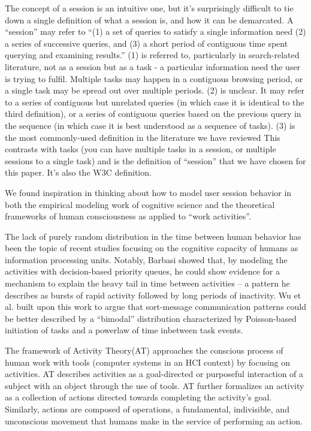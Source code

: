The concept of a session is an intuitive one, but it's surprisingly difficult to tie down a single definition of what a session is, and how it can be demarcated.
A ``session'' may refer to ``(1) a set of queries to satisfy a single information need (2) a series of successive queries, and (3) a short period of contiguous time spent querying and examining results.''\cite{jones2008beyond}
(1) is referred to, particularly in search-related literature,\cite{jones2008beyond, eickhoff2014lessons} not as a session but as a task - a particular information need the user is trying to fulfil.
Multiple tasks may happen in a contiguous browsing period, or a single task may be spread out over multiple periods.
(2) is unclear. It may refer to a series of contiguous but unrelated queries (in which case it is identical to the third definition), or a series of contiguous queries based on the previous query in the sequence (in which case it is best understood as a sequence of tasks).
(3) is the most commonly-used definition in the literature we have reviewed\cite{spiliopoulou2003framework,white2010assessing,govseva2006empirical,nadjarbashi2004improving} This contrasts with tasks (you can have multiple tasks in a session, or multiple sessions to a single task) and is the definition of ``session'' that we have chosen for this paper. It's also the W3C definition.\cite{W3C1999}

We found inspiration in thinking about how to model user session behavior in both the empirical modeling work of cognitive science and the theoretical frameworks of human consciousness as applied to ``work activities''.
 
The lack of purely random distribution in the time between human behavior has been the topic of recent studies focusing on the cognitive capacity of humans as information processing units.  Notably, Barbasi showed that, by modeling the activities with decision-based priority queues, he could show evidence for a mechanism to explain the heavy tail in time between activities\cite{barabasi2005origin} -- a pattern he describes as bursts of rapid activity followed by long periods of inactivity.  Wu et al. built upon this work to argue that sort-message communication patterns could be better described by a ``bimodal'' distribution characterized by Poisson-based initiation of tasks and a powerlaw of time inbetween task events\cite{wu2010evidence}.

The framework of Activity Theory(AT) approaches the conscious process of human work with tools (computer systems in an HCI context) by focusing on activities. AT describes activities as a goal-directed or purposeful interaction of a subject with an object through the use of tools\cite{nardi96context}. AT further formalizes an activity as a collection of actions directed towards completing the activity's goal.  Similarly, actions are composed of operations, a fundamental, indivisible, and unconscious movement that humans make in the service of performing an action.

